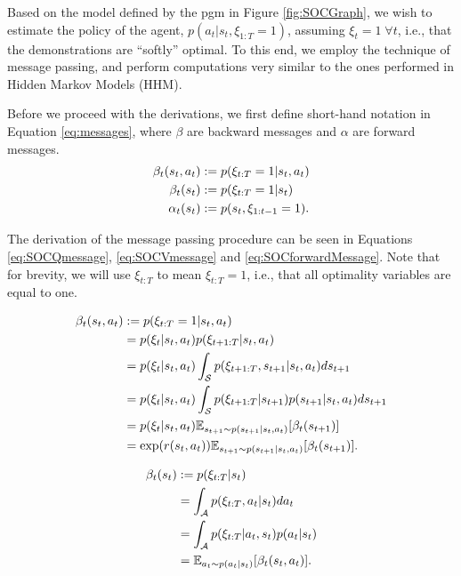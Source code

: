 \documentclass{report}
\numberwithin{equation}{section}
\numberwithin{figure}{section}
\numberwithin{table}{section}
\numberwithin{algorithm}{section}
\begin{document}
Based on the model defined by the pgm in Figure \ref{fig:SOCGraph}, 
we wish to estimate the policy of the agent, $p(a_t|s_t, \xi_{1:T}=1)$, 
assuming $\xi_t=1\;\forall t$, 
i.e., that the demonstrations are ``softly'' optimal. 
To this end, we employ the technique of message passing, and perform 
computations very similar to the ones performed in Hidden Markov Models 
(HHM).

Before we proceed with the derivations,
we first define short-hand notation in Equation \ref{eq:messages}, 
where $\beta$ are backward messages and $\alpha$ are forward messages.
\begin{align}\label{eq:messages}
  \beta_t(s_t, a_t)&:=p(\xi_{t:T}=1|s_t, a_t)\notag\\
  \beta_t(s_t)&:=p(\xi_{t:T}=1|s_t)\notag\\
  \alpha_t(s_t)&:=p(s_t, \xi_{1:t-1}=1).
\end{align}

The derivation of the message passing procedure can be seen 
in Equations \ref{eq:SOCQmessage}, \ref{eq:SOCVmessage} and 
\ref{eq:SOCforwardMessage}. Note that for brevity, we will use 
$\xi_{t:T}$ to mean $\xi_{t:T}=1$, i.e., that all optimality variables 
are equal to one.

\begin{align}\label{eq:SOCQmessage}
  \beta_t(s_t, a_t)&:=p(\xi_{t:T}=1|s_t, a_t)\notag\\
  &=p(\xi_t|s_t, a_t)p(\xi_{t+1:T}|s_t, a_t)\notag\\
  &=p(\xi_t|s_t, a_t)\int_{\mathcal{S}}p(\xi_{t+1:T}, s_{t+1}|s_t,a_t)ds_{t+1}\notag\\
  &=p(\xi_t|s_t, a_t)\int_{\mathcal{S}}p(\xi_{t+1:T}|s_{t+1})p(s_{t+1}|s_t,a_t)ds_{t+1}\notag\\
  &=p(\xi_t|s_t, a_t)\mathbb{E}_{s_{t+1}\sim p(s_{t+1}|s_t, a_t)}[\beta_t(s_{t+1})]\notag\\
  &=\exp(r(s_t, a_t))\mathbb{E}_{s_{t+1}\sim p(s_{t+1}|s_t, a_t)}[\beta_t(s_{t+1})].
\end{align}

\begin{align}\label{eq:SOCVmessage}
  \beta_t(s_t)&:=p(\xi_{t:T}|s_t)\notag\\
  &=\int_{\mathcal{A}}p(\xi_{t:T},a_t|s_t)da_t\notag\\
  &=\int_{\mathcal{A}}p(\xi_{t:T}|a_t, s_t)p(a_t|s_t)\notag\\
  &=\mathbb{E}_{a_t\sim p(a_t|s_t)}[\beta_t(s_t, a_t)].
\end{align}
\end{document}
